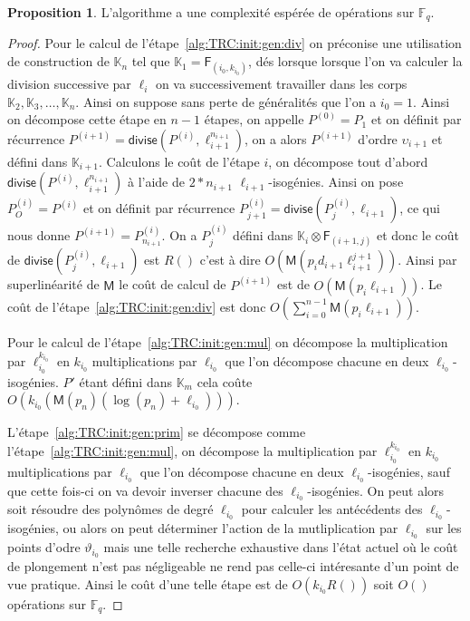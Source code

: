 \documentclass[10pt,a4paper]{book}
\theoremstyle{plain}
\theoremstyle{definition}
\theoremstyle{definition}
\theoremstyle{definition}
\newtheorem{prop}[thm]{Proposition}
\theoremstyle{definition}
\theoremstyle{remark}
\theoremstyle{remark}
\theoremstyle{definition}
\begin{document}
\begin{prop}
L'algorithme a une complexité espérée de opérations sur $\mathbb{F}_q$.
\end{prop}

\begin{proof}
Pour le calcul de l'étape~\ref{alg:TRC:init:gen:div} on préconise une 
utilisation de construction de $\mathbb{K}_n$ tel que $\mathbb{K}_1=
\mathsf{F}_{(i_0,k_{i_0})}$, dés lorsque lorsque l'on va calculer la division 
successive par $\ell_i$ on va successivement travailler dans les corps 
$\mathbb{K}_2, \mathbb{K}_3, \dots, \mathbb{K}_n$. Ainsi on suppose sans perte 
de généralités que l'on a $i_0=1$. Ainsi on décompose cette étape en $n-1$ 
étapes, on appelle $P^{(0)}=P_{1}$ et on définit par récurrence 
$P^{(i+1)}=\mathsf{divise}(P^{(i)},\ell_{i+1}^{n_{i+1}})$, on a alors 
$P^{(i+1)}$ d'ordre $\upsilon_{i+1}$ et défini dans $\mathbb{K}_{i+1}$. 
Calculons le coût de l'étape $i$, on décompose tout d'abord 
$\mathsf{divise}(P^{(i)},\ell_{i+1}^{n_{i+1}})$ à l'aide de $2*n_{i+1}$ 
$\ell_{i+1}$-isogénies. Ainsi on pose $P^{(i)}_O=P^{(i)}$ et on définit par 
récurrence $P^{(i)}_{j+1}=\mathsf{divise}(P^{(i)}_{j},\ell_{i+1})$, ce qui nous
 donne $P^{(i+1)}=P^{(i)}_{n_{i+1}}$. On a $P^{(i)}_{j}$ défini dans 
 $\mathbb{K}_i\otimes \mathsf{F}_{(i+1,j)}$ et donc le coût de 
 $\mathsf{divise}(P^{(i)}_{j},\ell_{i+1})$ est $R()$ c'est à dire 
 $O(\mathsf{M}(p_i d_{i+1} \ell_{i+1}^{j+1}))$. Ainsi par superlinéarité de 
 $\mathsf{M}$ le coût de calcul de $P^{(i+1)}$ est de $O(\mathsf{M}(p_i \ell_{i+1}))$.
 Le coût de l'étape~\ref{alg:TRC:init:gen:div} est donc $O(\sum_{i=0}^{n-1}\mathsf{M}(p_i \ell_{i+1}))$. 

Pour le calcul de l'étape~\ref{alg:TRC:init:gen:mul} on décompose la 
multiplication par $\ell_{i_0}^{k_{i_0}}$ en $k_{i_0}$ multiplications par 
$\ell_{i_0}$ que l'on décompose chacune en deux $\ell_{i_0}$-isogénies. $P'$ 
étant défini dans $\mathbb{K}_{m}$ cela coûte 
$O(k_{i_0}(\mathsf{M}(p_n)(\log(p_n)+\ell_{i_0})))$.

L'étape~\ref{alg:TRC:init:gen:prim} se décompose comme 
l'étape~\ref{alg:TRC:init:gen:mul}, on décompose la multiplication par 
$\ell_{i_0}^{k_{i_0}}$ en $k_{i_0}$ multiplications par $\ell_{i_0}$ que l'on 
décompose chacune en deux $\ell_{i_0}$-isogénies, sauf que cette fois-ci on va
devoir inverser chacune des $\ell_{i_0}$-isogénies. On peut alors soit résoudre
des polynômes de degré $\ell_{i_0}$ pour calculer les antécédents des 
$\ell_{i_0}$-isogénies, ou alors on peut déterminer l'action de la 
mutliplication par $\ell_{i_0}$ sur les points d'odre $\vartheta_{i_0}$ 
mais une telle recherche exhaustive dans l'état actuel où le coût de plongement
n'est pas négligeable ne rend pas celle-ci intéresante d'un point de vue 
pratique. Ainsi le coût d'une telle étape est de $O(k_{i_0}R())$ soit $O()$ 
opérations sur $\mathbb{F}_q$.
\end{proof}
\end{document}
